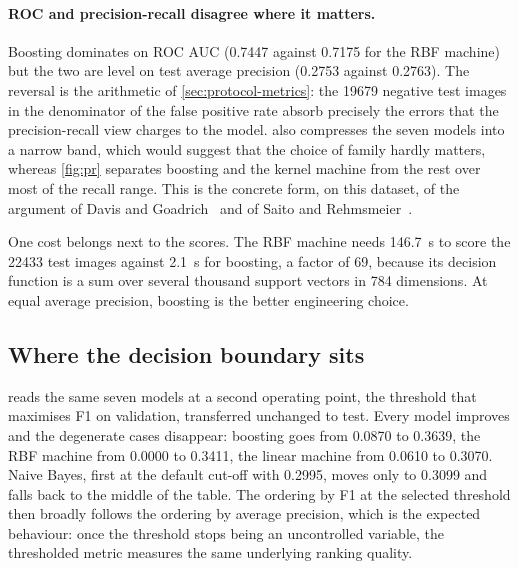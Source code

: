\paragraph{ROC and precision-recall disagree where it matters.}
Boosting dominates on ROC AUC (\num{0.7447} against \num{0.7175} for the RBF
machine) but the two are level on test average precision (\num{0.2753} against
\num{0.2763}). The reversal is the arithmetic of \cref{sec:protocol-metrics}:
the \num{19679} negative test images in the denominator of the false positive
rate absorb precisely the errors that the precision-recall view charges to the
model.  also compresses the seven models into a narrow band, which
would suggest that the choice of family hardly matters, whereas \cref{fig:pr}
separates boosting and the kernel machine from the rest over most of the recall
range. This is the concrete form, on this dataset, of the argument of Davis and
Goadrich~\cite{davis2006relationship} and of Saito and
Rehmsmeier~\cite{saito2015precision}.

One cost belongs next to the scores. The RBF machine needs \SI{146.7}{\second}
to score the \num{22433} test images against \SI{2.1}{\second} for boosting, a
factor of \num{69}, because its decision function is a sum over several thousand
support vectors in \num{784} dimensions. At equal average precision, boosting is
the better engineering choice.

\subsection{Where the decision boundary sits}
\label{sec:results-operating}

 reads the same seven models at a second operating point,
the threshold that maximises F1 on validation, transferred unchanged to test.
Every model improves and the degenerate cases disappear: boosting goes from
\num{0.0870} to \num{0.3639}, the RBF machine from \num{0.0000} to \num{0.3411},
the linear machine from \num{0.0610} to \num{0.3070}. Naive Bayes, first at the
default cut-off with \num{0.2995}, moves only to \num{0.3099} and falls back to
the middle of the table. The ordering by F1 at the selected threshold then
broadly follows the ordering by average precision, which is the expected
behaviour: once the threshold stops being an uncontrolled variable, the
thresholded metric measures the same underlying ranking quality.

\begin{table}[t]
  \centering
  \caption{Test precision, recall and F1 at the default cut-off of each family
  (\num{0.5} on a posterior, \num{0} on a margin) and at the cut-off that
  maximises validation F1. The test split is never used to choose the threshold.
  Every model gains, and the two models that made almost no positive call at the
  default cut-off gain the most.}
  \label{tab:operating}
  \small
  
\end{table}


